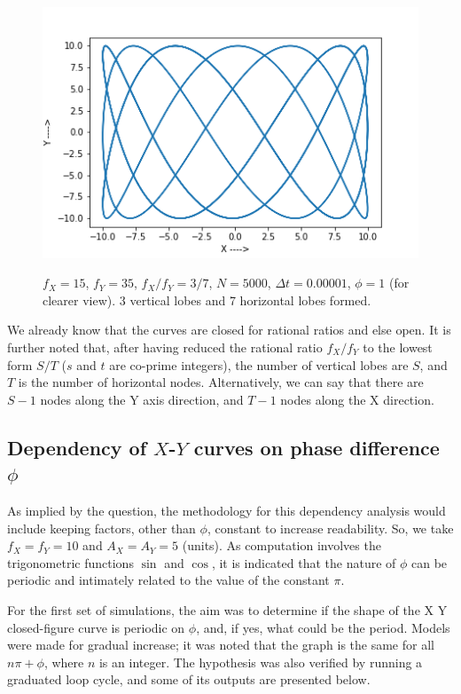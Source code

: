 \documentclass{report}
\begin{document}
\begin{figure}[H]
	\centering
	\includegraphics[width = \textwidth]{ratio5.png}
	\label{ratio5}
	\caption{$f_X=15$, $f_Y=35$, $f_X/f_Y=3/7$, $N=5000$, $\Delta t=0.00001$, $\phi=1$ (for clearer view). 3 vertical lobes and 7 horizontal lobes formed.}
\end{figure}
We already know that the curves are closed for rational ratios and else open. It is further noted that, after having reduced the rational ratio $f_X/f_Y$ to the lowest form $S/T$ ($s$ and $t$ are co-prime integers), the number of vertical lobes are $S$, and $T$ is the number of horizontal nodes. Alternatively, we can say that there are $S-1$ nodes along the Y axis direction, and $T-1$ nodes along the X direction.

\subsection*{Dependency of $X$-$Y$ curves on phase difference $\phi$}
As implied by the question, the methodology for this dependency analysis would include keeping factors, other than $\phi$, constant to increase readability. So, we take $f_X=f_Y=10$ and $A_X=A_Y=5$ (units). As computation involves the trigonometric functions $\sin$ and $\cos$, it is indicated that the nature of $\phi$ can be periodic and intimately related to the value of the constant $\pi$. 

For the first set of simulations, the aim was to determine if the shape of the X Y closed-figure curve is periodic on $\phi$, and, if yes, what could be the period. Models were made for gradual increase; it was noted that the graph is the same for all $n\pi + \phi$, where $n$ is an integer. The hypothesis was also verified by running a graduated loop cycle, and some of its outputs are presented below.
\end{document}
